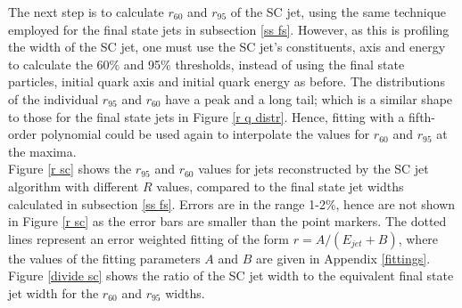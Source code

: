 \documentclass[a4paper,11pt, onecolumn]{article}
\begin{document}
  The next step is to calculate $r_{60}$ and $r_{95}$ of the SC jet, using the same technique employed for the final state jets in subsection 
  \ref{ss fs}. However, as this is profiling the width of the SC jet, one must use the SC jet's constituents, axis and energy to 
  calculate the 60\% and 95\% thresholds, instead of using the final state particles, initial quark axis and initial quark energy as before.
  The distributions of the individual $r_{95}$ and $r_{60}$ have a peak and a long tail; which is a similar shape to those 
  for the final state jets in Figure \ref{r q distr}.
  Hence, fitting with a fifth-order polynomial could be used again to interpolate the values for $r_{60}$ and $r_{95}$ at the maxima. \\

  Figure \ref{r sc} shows the $r_{95}$ and $r_{60}$ values for jets reconstructed by the SC jet algorithm with different $R$ values,
  compared to the final state jet widths calculated in subsection \ref{ss fs}. Errors are in the range 1-2\%, hence are not shown in Figure
  \ref{r sc} as the error bars are smaller than the point markers.
  The dotted lines represent an error weighted fitting of the form $r = A/(E_{jet}+B)$, where the values of the fitting parameters $A$ and $B$ 
  are given in Appendix \ref{fittings}. Figure \ref{divide sc} shows the ratio of the SC jet width to the equivalent final state jet width for 
  the $r_{60}$ and $r_{95}$ widths. \\
\end{document}
